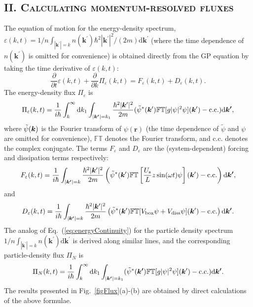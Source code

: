 \documentclass[prl,aps,twocolumn, a4paper,longbibliography,superscriptaddress]{revtex4-2}
\newcommand{\Us}{U_{\textrm{s}}}
\begin{document}
\subsection{\textsc{II. Calculating momentum-resolved fluxes}}
The equation of motion for the energy-density spectrum, $\varepsilon(k,t)= 1/n\int_{|\boldsymbol{k^\prime}|=k}n({\boldsymbol{k}^\prime})\hbar^2|\boldsymbol{k}^{\prime}|^2/(2m)\text{d}\boldsymbol{k^\prime}$ (where the time dependence of $n({\boldsymbol{k}^\prime})$ is omitted for convenience) is obtained directly from the GP equation by taking the time derivative of $\varepsilon(k,t)$:
\begin{equation}
\label{eq:energyContinuity}
    \frac{\partial}{\partial t}\varepsilon(k,t)+\frac{\partial}{\partial k}\Pi_\varepsilon(k,t)=F_\varepsilon(k,t)+D_\varepsilon(k,t).
\end{equation}
The energy-density flux $\Pi_\varepsilon$ is
\begin{equation}
\Pi_\varepsilon(k,t)=\frac{1}{i\hbar}\int_k^\infty \text{d}k_1\int_{|\boldsymbol{k^\prime}|=k_1}\frac{\hbar^2|\boldsymbol{k}^{\prime}|^2}{2m}(\Tilde{\psi}^*(\boldsymbol{k}^{\prime})\mathbb{FT}[g|\psi|^2\psi](\boldsymbol{k}^{\prime})-\text{c.c.})\text{d}\boldsymbol{k^\prime},
\label{eqPiEpsilon}
\end{equation}
where $\Tilde{\psi}(\boldsymbol{k})$ is the Fourier transform of $\psi(\boldsymbol{r})$ (the time dependence of $\tilde{\psi}$ and $\psi$ are omitted for convenience), $\mathbb{FT}$ denotes the Fourier transform, and $\text{c.c.}$ denotes the complex conjugate. The terms $F_\varepsilon$ and $D_\varepsilon$ are the (system-dependent) forcing and dissipation terms respectively:
$$F_\varepsilon(k,t)=\frac{1}{i\hbar}\int_{|\boldsymbol{k^\prime}|=k}\frac{\hbar^2|\boldsymbol{k}^{\prime}|^2}{2m}\left(\Tilde{\psi}^*(\boldsymbol{k}^{\prime})\mathbb{FT}\left[\frac{\Us}{L}z\sin(\omega t)\psi\right](\boldsymbol{k}^{\prime})-\text{c.c.}\right)\text{d}\boldsymbol{k^\prime},$$
and
$$D_\varepsilon(k,t)=\frac{1}{i\hbar}\int_{|\boldsymbol{k^\prime}|=k}\frac{\hbar^2|\boldsymbol{k}^{\prime}|^2}{2m}\left(\Tilde{\psi}^*(\boldsymbol{k}^{\prime})\mathbb{FT}[V_{\mathrm{box}}\psi+V_{\mathrm{diss}}\psi](\boldsymbol{k}^{\prime})-\text{c.c.}\right)\text{d}\boldsymbol{k^\prime}.$$
The analog of Eq.~(\ref{eq:energyContinuity}) for the particle density spectrum $1/n\int_{|\boldsymbol{k^\prime}|=k}n({\boldsymbol{k}^\prime})\text{d}\boldsymbol{k^\prime}$ is derived along similar lines, and the corresponding particle-density flux $\Pi_N$ is
$$\Pi_N(k,t)=\frac{1}{i\hbar}\int_k^\infty \text{d}k_1\int_{|\boldsymbol{k^\prime}|=k_1}(\Tilde{\psi}^*(\boldsymbol{k^\prime})\mathbb{FT}[g|\psi|^2\psi](\boldsymbol{k}^{\prime})-\text{c.c.})\text{d}\boldsymbol{k^\prime}.$$
The results presented in Fig.~\ref{figFlux}(a)-(b) are obtained by direct calculations of the above formulae.
\end{document}

